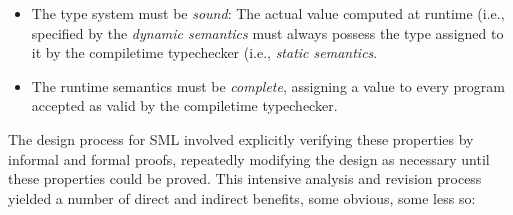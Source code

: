 \begin{itemize}
\item The type system must be {\it sound}: The actual value computed at runtime 
      (i.e., specified by the {\it dynamic semantics} must always possess the 
      type assigned to it by the compiletime typechecker (i.e., {\it static semantics}. 

\item The runtime semantics must be {\it complete}, assigning a value to every 
      program accepted as valid by the compiletime typechecker. 
\end{itemize}

The design process for SML involved explicitly verifying these properties by 
informal and formal proofs, repeatedly modifying the design as necessary 
until these properties could be proved.  This intensive analysis and revision 
process yielded a number of direct and indirect benefits, some obvious, some 
less so: 

